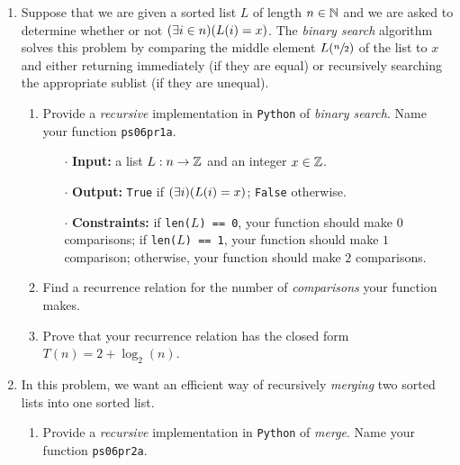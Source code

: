 \begin{enumerate}
    \item
        Suppose that we are given a sorted list $L$ of length $n \in \mathbb{N}$
        and we are asked to determine
        whether or not $\pn*{\exists i \in n}\pn*{L(i) = x}$.
        The \emph{binary search} algorithm solves this problem by comparing the middle element $L\pn*{\sfrac{n}{2}}$ of the list to $x$ and either returning immediately (if they are equal)
        or recursively searching the appropriate sublist (if they are unequal).
        \begin{enumerate}
            \item
                Provide a \emph{recursive} implementation in \texttt{Python} of \emph{binary search}.
                Name your function \texttt{ps06pr1a}.
                \begin{itemize}
                    \item[$\cdot$]
                        \textbf{Input:}
                        a list $L: n \to \mathbb{Z}$ and an integer $x \in \mathbb{Z}$.
                    \item[$\cdot$]
                        \textbf{Output:}
                        \texttt{True} if $\pn*{\exists i}\pn*{L(i) = x}$; \texttt{False} otherwise.
                    \item[$\cdot$]
                        \textbf{Constraints:}
                        if \texttt{len($L$) == 0}, your function should make $0$ comparisons;
                        if \texttt{len($L$) == 1}, your function should make $1$ comparison;
                        otherwise, your function should make $2$ comparisons.
                \end{itemize}
            \item
                Find a recurrence relation for the number of \emph{comparisons} your function makes.
            \item
                Prove that your recurrence relation has the closed form $T(n) = 2 + \log_2(n)$.
        \end{enumerate}
    \item
        In this problem,
        we want an efficient way of recursively \emph{merging} two sorted lists into one sorted list.
        \begin{enumerate}
            \item
                Provide a \emph{recursive} implementation in \texttt{Python} of \emph{merge}.
                Name your function \texttt{ps06pr2a}.
                \begin{itemize}

\end{itemize}
\end{enumerate}
\end{enumerate}
